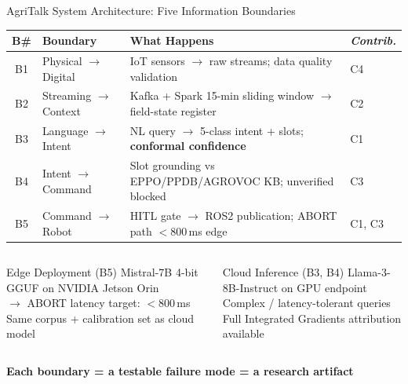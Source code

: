 \documentclass[aspectratio=169,10pt]{beamer}
\begin{document}
\begin{frame}{AgriTalk System Architecture: Five Information Boundaries}

\begin{center}
\small
\begin{tabular}{@{}clp{6.2cm}l@{}}
\toprule
\textbf{B\#} & \textbf{Boundary} & \textbf{What Happens} & \textit{Contrib.} \\
\midrule
B1 & Physical $\to$ Digital & IoT sensors $\to$ raw streams; data quality validation & C4 \\
B2 & Streaming $\to$ Context & Kafka + Spark 15-min sliding window $\to$ field-state register & C2 \\
B3 & Language $\to$ Intent & NL query $\to$ 5-class intent + slots; \textbf{conformal confidence} & C1 \\
B4 & Intent $\to$ Command & Slot grounding vs EPPO/PPDB/AGROVOC KB; unverified blocked & C3 \\
B5 & Command $\to$ Robot & HITL gate $\to$ ROS2 publication; ABORT path $<$800\,ms edge & C1, C3 \\
\bottomrule
\end{tabular}
\end{center}

\medskip
\begin{columns}[T]
\begin{block}{Edge Deployment (B5)}
\small
Mistral-7B 4-bit GGUF on NVIDIA Jetson Orin\\
$\to$ ABORT latency target: $<$800\,ms\\
Same corpus + calibration set as cloud model
\end{block}

\begin{block}{Cloud Inference (B3, B4)}
\small
Llama-3-8B-Instruct on GPU endpoint\\
Complex / latency-tolerant queries\\
Full Integrated Gradients attribution available
\end{block}
\end{columns}

\medskip
\begin{center}
\textbf{\color{techblue}Each boundary = a testable failure mode = a research artifact}
\end{center}

\end{frame}
\end{document}
